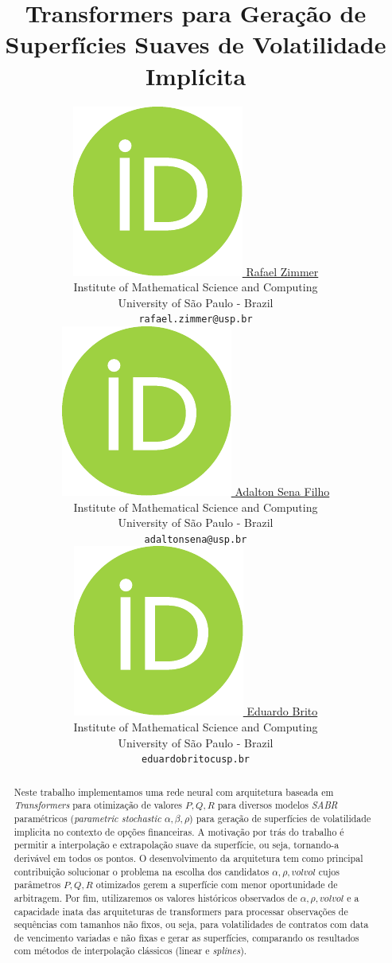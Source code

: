 \documentclass{article}
\title{Transformers para Geração de Superfícies Suaves de Volatilidade Implícita}
\author{ 
	\href{https://orcid.org/0009-0008-6064-9895}{
		\includegraphics[scale=0.06]{resources/orcid.pdf}
		\hspace{1mm}Rafael Zimmer
	}\\
	Institute of Mathematical Science and Computing\\
	University of São Paulo - Brazil \\
	\texttt{rafael.zimmer@usp.br} \\
	\And
	\href{https://orcid.org/0000-0000-0000-0000}{
		\includegraphics[scale=0.06]{resources/orcid.pdf}
		\hspace{1mm}Adalton Sena Filho
	}\\
	Institute of Mathematical Science and Computing\\
	University of São Paulo - Brazil \\
	\texttt{adaltonsena@usp.br} \\
	\And
	\href{https://orcid.org/0000-0000-0000-0000}{
		\includegraphics[scale=0.06]{resources/orcid.pdf}
		\hspace{1mm}Eduardo Brito
	}\\
	Institute of Mathematical Science and Computing\\
	University of São Paulo - Brazil \\
	\texttt{eduardobritocusp.br} \\
}
\begin{document}
	
	\maketitle
	
	\begin{abstract}
		Neste trabalho implementamos uma rede neural com arquitetura baseada em \textit{Transformers} para otimização de valores $P, Q, R$ para diversos modelos \textit{SABR} paramétricos (\textit{parametric stochastic $\alpha, \beta, \rho$}) para geração de superfícies de volatilidade implicita no contexto de opções financeiras. A motivação por trás do trabalho é permitir a interpolação e extrapolação suave da superfície, ou seja, tornando-a derivável em todos os pontos. O desenvolvimento da arquitetura tem como principal contribuição solucionar o problema na escolha dos candidatos $\alpha, \rho, volvol$ cujos parâmetros $P, Q, R$ otimizados gerem a superfície com menor oportunidade de arbitragem. Por fim, utilizaremos os valores históricos observados de $\alpha, \rho, volvol$ e a capacidade inata das arquiteturas de transformers para processar observações de sequências com tamanhos não fixos, ou seja, para volatilidades de contratos com data de vencimento variadas e não fixas e gerar as superfícies, comparando os resultados com métodos de interpolação clássicos (linear e \textit{splines}).
	\end{abstract}
	
	
	
	
	
	
	
	
	
	
	
	
\end{document}
